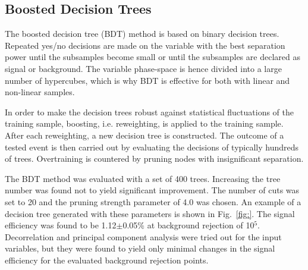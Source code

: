 \documentclass[a4paper]{jpconf}
\begin{document}




\subsection{Boosted Decision Trees}
The boosted decision tree (BDT) method is based on binary decision
trees. Repeated yes/no decisions are made on the variable with the
best separation power until the subsamples become small or until the
subsamples are declared as signal or background. The variable
phase-space is hence divided into a large number of hypercubes, which is
why BDT is effective for both with linear and non-linear
samples.

In order to make the decision trees robust against statistical
fluctuations of the training sample, boosting, i.e. reweighting, is
applied to the training sample. After each reweighting, a new decision
tree is constructed. The outcome of a tested event is then carried out
by evaluating the decisions of typically hundreds of
trees. Overtraining is countered by pruning nodes with insignificant
separation. 

The BDT method was evaluated with a set of 400 trees. Increasing the
tree number was found not to yield significant improvement. The number
of cuts was set to 20 and the pruning strength
parameter of 4.0 was chosen. An example of a decision tree generated
with these parameters is shown in Fig.~\ref{fig:}. The signal efficiency was
found to be 1.12$\pm$0.05\% at background rejection of 10$^5$.
Decorrelation and principal component analysis were tried out for the
input variables, but they were found to yield only minimal changes in
the signal efficiency for the evaluated background rejection points.
\end{document}
